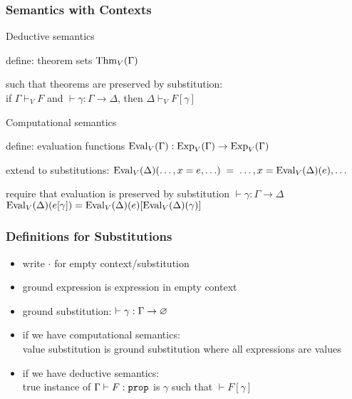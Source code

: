 \begin{frame}\frametitle{Semantics with Contexts}
\begin{blockitems}{Deductive semantics}
\item define: theorem sets $\mathrm{Thm}_V(\Gamma)$
\item such that theorems are preserved by substitution: \\
 if $\Gamma\vdash_V F$ and $\vdash \gamma:\Gamma\to\Delta$, then $\Delta\vdash_V F[\gamma]$
\end{blockitems}

\begin{blockitems}{Computational semantics}
\item define: evaluation functions $\mathrm{Eval}_V(\Gamma):\mathrm{Exp}_V(\Gamma)\to\mathrm{Exp}_V(\Gamma)$
\item extend to substitutions: $\mathrm{Eval}_V(\Delta)(\ldots,x=e,\ldots)\;=\;\ldots,x=\mathrm{Eval}_V(\Delta)(e), \ldots$
\item require that evaluation is preserved by substitution $\vdash \gamma:\Gamma\to\Delta$ \\
  $\mathrm{Eval}_V(\Delta)(e[\gamma])=\mathrm{Eval}_V(\Delta)(e)[\mathrm{Eval}_V(\Delta)(\gamma)]$
\end{blockitems}
\end{frame}

\begin{frame}\frametitle{Definitions for Substitutions}
\begin{itemize}
\item write $\cdot$ for empty context/substitution
\item ground expression is expression in empty context
\item ground substitution: $\vdash \gamma:\Gamma\to \varnothing$
\item if we have computational semantics: \\ value substitution is ground substitution where all expressions are values
\item if we have deductive semantics: \\
 true instance of $\Gamma\vdash F:\prop$ is $\gamma$ such that $\vdash F[\gamma]$
\end{itemize}
\end{frame}

